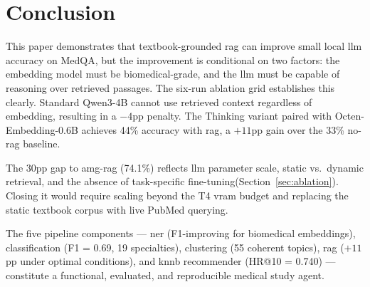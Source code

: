 \section{Conclusion}
\label{sec:conclusion}

This paper demonstrates that textbook-grounded \gls{rag} can improve small local \gls{llm} accuracy on MedQA, but the improvement is conditional on two factors: the embedding model must be biomedical-grade, and the \gls{llm} must be capable of reasoning over retrieved passages. The six-run ablation grid establishes this clearly. Standard Qwen3-4B cannot use retrieved context regardless of embedding, resulting in a $-4$\gls{pp} penalty. The Thinking variant paired with Octen-Embedding-0.6B achieves 44\% accuracy with \gls{rag}, a $+11$\gls{pp} gain over the 33\% no-\gls{rag} baseline.

The 30\gls{pp} gap to \gls{amg-rag} (74.1\%) reflects \gls{llm} parameter scale, static vs.\ dynamic retrieval, and the absence of task-specific fine-tuning(Section~\ref{sec:ablation}). Closing it would require scaling beyond the T4 \gls{vram} budget and replacing the static textbook corpus with live PubMed querying.

The five pipeline components --- \gls{ner} (F1-improving for biomedical embeddings), classification (F1 = 0.69, 19 specialties), clustering (55 coherent topics), \gls{rag} ($+11$\gls{pp} under optimal conditions), and \gls{knnb} recommender (HR@10 = 0.740) --- constitute a functional, evaluated, and reproducible medical study agent.
